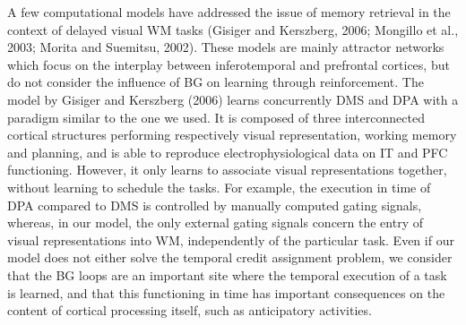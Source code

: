 \documentclass[
  11pt,
  a4paper,
]{scrbook}
\begin{document}
A few computational models have addressed the issue of memory retrieval
in the context of delayed visual WM tasks (Gisiger and Kerszberg, 2006;
Mongillo et al., 2003; Morita and Suemitsu, 2002). These models are
mainly attractor networks which focus on the interplay between
inferotemporal and prefrontal cortices, but do not consider the
influence of BG on learning through reinforcement. The model by Gisiger
and Kerszberg (2006) learns concurrently DMS and DPA with a paradigm
similar to the one we used. It is composed of three interconnected
cortical structures performing respectively visual representation,
working memory and planning, and is able to reproduce
electrophysiological data on IT and PFC functioning. However, it only
learns to associate visual representations together, without learning to
schedule the tasks. For example, the execution in time of DPA compared
to DMS is controlled by manually computed gating signals, whereas, in
our model, the only external gating signals concern the entry of visual
representations into WM, independently of the particular task. Even if
our model does not either solve the temporal credit assignment problem,
we consider that the BG loops are an important site where the temporal
execution of a task is learned, and that this functioning in time has
important consequences on the content of cortical processing itself,
such as anticipatory activities.
\end{document}
